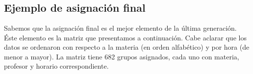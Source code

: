 \appendix
\chapter{ }







\section{Ejemplo de asignación final} \label{Ej_AsigFinal}

Sabemos que la asignación final es el mejor elemento de la última generación. Éste elemento es la matriz que presentamos a continuación. Cabe aclarar que los datos se ordenaron con respecto a la materia (en orden alfabético) y por hora (de menor a mayor). La matriz tiene 682 grupos asignados, cada uno con materia, profesor y horario correspondiente.

\dfNmatAsigFinal


